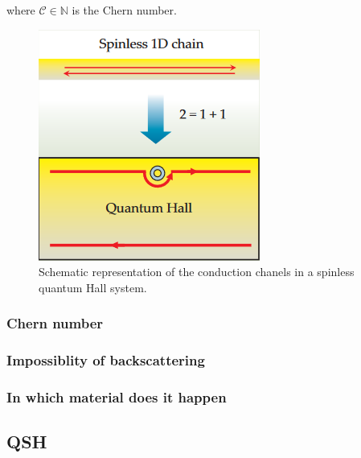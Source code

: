 where $\mathcal{C} \in \mathbb{N}$ is the Chern number.

\begin{figure}[h!]
    \includegraphics[scale = 0.7]{sections/visuel/spinless.png}
    \caption{Schematic representation of the conduction chanels in a spinless quantum Hall system.\cite{qi_quantum_2010}}
    \label{spinless}
\end{figure}



\subsubsection{Chern number}




\subsubsection{Impossiblity of backscattering}

\subsubsection{In which material does it happen}


\subsection{QSH}

